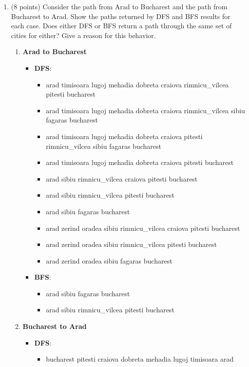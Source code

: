 \documentclass{article}%
\begin{document}
\begin{enumerate}
	\begin{enumerate}
	\item (8 points) Consider the path from Arad to Bucharest and the path from Bucharest to Arad. Show the paths returned by DFS and BFS results for each case.
Does either DFS or BFS return a path through the same set of cities for either? Give a reason for this behavior.
		\begin{enumerate}
		\item \textbf{Arad to Bucharest}
			\begin{itemize}
			\item \textbf{DFS}:
				\begin{itemize}
				\item arad timisoara lugoj mehadia dobreta craiova rimnicu\_vilcea pitesti bucharest
				\item arad timisoara lugoj mehadia dobreta craiova rimnicu\_vilcea sibiu fagaras bucharest 
				\item arad timisoara lugoj mehadia dobreta craiova pitesti rimnicu\_vilcea sibiu fagaras bucharest 
				\item arad timisoara lugoj mehadia dobreta craiova pitesti bucharest 
				\item arad sibiu rimnicu\_vilcea craiova pitesti bucharest 
				\item arad sibiu rimnicu\_vilcea pitesti bucharest 
				\item arad sibiu fagaras bucharest 
				\item arad zerind oradea sibiu rimnicu\_vilcea craiova pitesti bucharest 
				\item arad zerind oradea sibiu rimnicu\_vilcea pitesti bucharest 
				\item arad zerind oradea sibiu fagaras bucharest 
				\end{itemize}
			\item \textbf{BFS}:
				\begin{itemize}
				\item arad sibiu fagaras bucharest 
				\item arad sibiu rimnicu\_vilcea pitesti bucharest
				\end{itemize}
			\end{itemize}
		\item \textbf{Bucharest to Arad}
		\begin{itemize}
			\item \textbf{DFS}:
				\begin{itemize}
				\item bucharest pitesti craiova dobreta mehadia lugoj timisoara arad

\end{itemize}
\end{itemize}
\end{enumerate}
\end{enumerate}
\end{enumerate}
\end{document}
